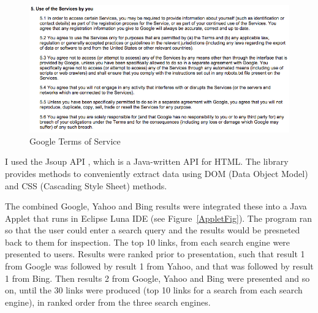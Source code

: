 \documentclass[a4paper, 11pt]{article}
\begin{document}
\begin{figure}[H]
\begin{center}
\includegraphics[scale=0.6]{GoogleToS}
\caption{Google Terms of Service}
\label{GoogleToS1}

\end{center}
\end{figure}


I used the Jsoup API \cite{jsoup}, which is a Java-written API for HTML. The library provides methods to conveniently extract data using DOM (Data Object Model) and CSS (Cascading Style Sheet) methods. 

\vspace{5mm}
The combined Google, Yahoo and Bing results were integrated these into a Java Applet that runs in Eclipse Luna IDE (see Figure~\ref{AppletFig}). The program ran so that the user could enter a search query and the results would be presneted back to them for inspection. The top 10 links, from each search engine were presented to users. Results were ranked prior to presentation, such that result 1 from Google was followed by result 1 from Yahoo, and that was followed by result 1 from Bing. Then results 2 from Google, Yahoo and Bing were presented and so on, until the 30 links were produced (top 10 links for a search from each search engine), in ranked order from the three search engines. 
\end{document}
